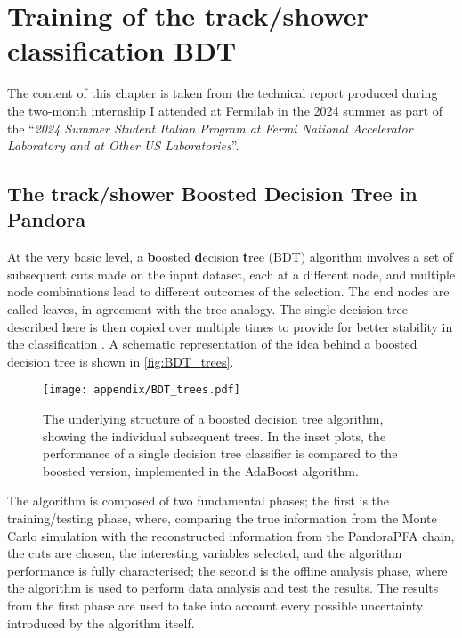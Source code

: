 \chapter{Training of the track/shower classification BDT}

The content of this chapter is taken from the technical report produced during the two-month internship I attended at Fermilab in the 2024 summer as part of the ``\emph{2024 Summer Student Italian Program at Fermi National Accelerator Laboratory and at Other US Laboratories}''. 

\section{The track/shower Boosted Decision Tree in Pandora} \label{sec:A_bdt}

At the very basic level, a \textbf{b}oosted \textbf{d}ecision \textbf{t}ree (BDT) algorithm involves a set of subsequent cuts made on the input dataset, each at a different node, and multiple node combinations lead to different outcomes of the selection. 
The end nodes are called leaves, in agreement with the tree analogy. 
The single decision tree described here is then copied over multiple times to provide for better stability in the classification \cite{Cornell:2021gut, FREUND1997119}. A schematic representation of the idea behind a boosted decision tree is shown in \autoref{fig:BDT_trees}. 

\begin{figure*}
    \centering
    \texttt{[image: appendix/BDT\_trees.pdf]}
    \caption{The underlying structure of a boosted decision tree algorithm, showing the individual subsequent trees. In the inset plots, the performance of a single decision tree classifier is compared to the boosted version, implemented in the AdaBoost \cite{FREUND1997119} algorithm.}
    \label{fig:BDT_trees}
\end{figure*}

The algorithm is composed of two fundamental phases; the first is the training/testing phase, where, comparing the true information from the Monte Carlo simulation with the reconstructed information from the PandoraPFA chain, the cuts are chosen, the interesting variables selected, and the algorithm performance is fully characterised; the second is the offline analysis phase, where the algorithm is used to perform data analysis and test the results. The results from the first phase are used to take into account every possible uncertainty introduced by the algorithm itself. 

